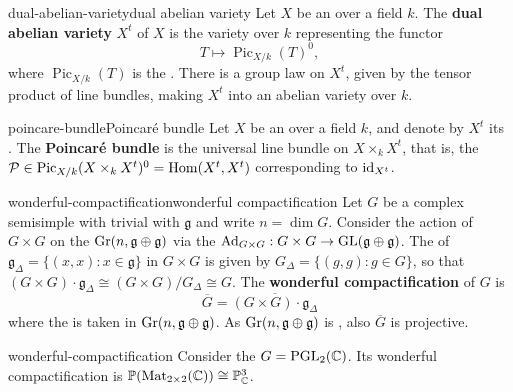 \begin{topic}{dual-abelian-variety}{dual abelian variety}
    Let $X$ be an  over a field $k$. The \textbf{dual abelian variety} $X^t$ of $X$ is the variety over $k$ representing the functor
    \[ T \mapsto \operatorname{Pic}_{X/k}(T)^0 , \]
    where $\operatorname{Pic}_{X/k}(T)$ is the . There is a group law on $X^t$, given by the tensor product of line bundles, making $X^t$ into an abelian variety over $k$.
\end{topic}

\begin{topic}{poincare-bundle}{Poincaré bundle}
    Let $X$ be an  over a field $k$, and denote by $X^t$ its . The \textbf{Poincaré bundle} is the universal line bundle on $X \times_k X^t$, that is, the  $\mathcal{P} \in \operatorname{Pic}_{X/k}(X \times_k X^t)^0 = \operatorname{Hom}(X^t, X^t)$ corresponding to $\textup{id}_{X^t}$.
\end{topic}

\begin{topic}{wonderful-compactification}{wonderful compactification}
    Let $G$ be a complex  semisimple  with trivial  with  $\mathfrak{g}$ and write $n = \dim G$. Consider the action of $G \times G$ on the  $\textup{Gr}(n, \mathfrak{g} \oplus \mathfrak{g})$ via the  $\textup{Ad}_{G \times G} : G \times G \to \textup{GL}(\mathfrak{g} \oplus \mathfrak{g})$. The  of $\mathfrak{g}_\Delta = \{ (x, x) : x \in \mathfrak{g} \}$ in $G \times G$ is given by $G_\Delta = \{ (g, g) : g \in G \}$, so that $(G \times G) \cdot \mathfrak{g}_\Delta \cong (G \times G) / G_\Delta \cong G$.
    The \textbf{wonderful compactification} of $G$ is
    \[ \overline{G} = \overline{(G \times G) \cdot \mathfrak{g}_\Delta} \]
    where the  is taken in $\textup{Gr}(n, \mathfrak{g} \oplus \mathfrak{g})$. As $\textup{Gr}(n, \mathfrak{g} \oplus \mathfrak{g})$ is , also $\overline{G}$ is projective.
\end{topic}

\begin{example}{wonderful-compactification}
    Consider the  $G = \textup{PGL}_2(\mathbb{C})$. Its wonderful compactification is $\mathbb{P}(\textup{Mat}_{2 \times 2}(\mathbb{C})) \cong \mathbb{P}^3_{\mathbb{C}}$.
\end{example}

